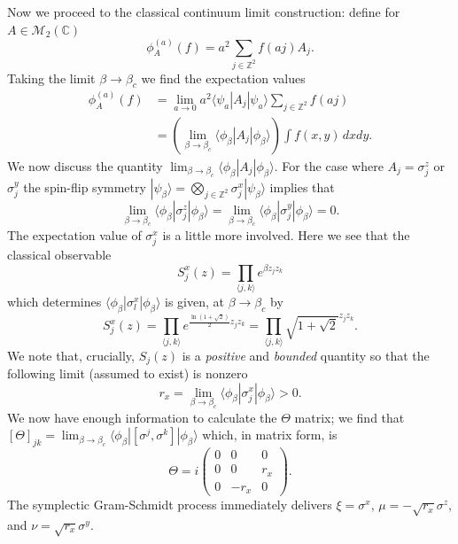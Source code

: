 \documentclass[prl,twocolumn,lengthcheck,superscriptaddress]{revtex4-1}
\theoremstyle{definition}
\theoremstyle{remark}
\begin{document}
Now we proceed to the classical continuum limit construction: define for $A\in \mathcal{M}_2(\mathbb{C})$ 
\begin{equation}
	\phi_A^{(a)}(f) = a^2\sum_{j\in \mathbb{Z}^2} f(aj) A_j.
\end{equation}
Taking the limit $\beta \rightarrow \beta_c$ we find the expectation values
\begin{equation}
	\begin{split}
		\phi_A^{(a)}(f) &= \lim_{a\rightarrow0}a^2 \langle \psi_a|A_j|\psi_a\rangle \sum_{j\in \mathbb{Z}^2} f(aj) \\
		&= \left(\lim_{\beta\rightarrow\beta_c} \langle \phi_\beta|A_j|\phi_\beta\rangle\right) \int f(x,y)\,dxdy.
	\end{split}
\end{equation}
We now discuss the quantity $\lim_{\beta\rightarrow\beta_c} \langle \phi_\beta|A_j|\phi_\beta\rangle$. For the case where $A_j = \sigma^z_j$ or $\sigma^y_j$ the spin-flip symmetry $|\psi_\beta\rangle = \bigotimes_{j\in \mathbb{Z}^2} \sigma^x_j|\psi_\beta\rangle$ implies that
\begin{equation}
	\lim_{\beta\rightarrow\beta_c} \langle \phi_\beta|\sigma^z_j|\phi_\beta\rangle = \lim_{\beta\rightarrow\beta_c} \langle \phi_\beta|\sigma^y_j|\phi_\beta\rangle = 0.
\end{equation}
The expectation value of $\sigma_j^x$ is a little more involved. Here we see that the classical observable
\begin{equation}
	S_j^x(z) =  \prod_{\langle j,k\rangle}e^{\beta z_jz_k}
\end{equation} 
which determines $\langle \phi_\beta|\sigma^x_l|\phi_\beta\rangle$ is given, at $\beta\rightarrow \beta_c$ by
\begin{equation}
	S_j^x(z) = \prod_{\langle j,k\rangle}e^{\frac{\ln(1+\sqrt{2})}{2}z_jz_k} = \prod_{\langle j,k\rangle}\sqrt{1+\sqrt{2}}^{z_jz_k}.
\end{equation} 
We note that, crucially, $S_j(z)$ is a \emph{positive} and \emph{bounded} quantity so that the following limit (assumed to exist) is nonzero 
\begin{equation}
	r_x = \lim_{\beta\rightarrow\beta_c} \langle \phi_\beta|\sigma^x_j|\phi_\beta\rangle > 0.
\end{equation}
We now have enough information to calculate the $\Theta$ matrix; we find that $[\Theta]_{jk} = \lim_{\beta\rightarrow\beta_c} \langle \phi_\beta| [\sigma^j, \sigma^k]|\phi_\beta\rangle$ which, in matrix form, is
\begin{equation}
	\Theta = i\begin{pmatrix} 0 & 0 & 0 \\ 0 & 0 & r_x \\ 0 & -r_x & 0\end{pmatrix}.
\end{equation}
The symplectic Gram-Schmidt process immediately delivers $\xi = \sigma^x$, $\mu = -\sqrt{r_x}\sigma^z$, and $\nu = \sqrt{r_x}\sigma^y$.
\end{document}
